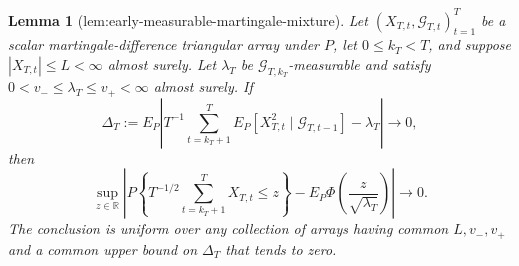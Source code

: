 \documentclass{article}
\newtheorem{lemma}{Lemma}
\begin{document}
\begin{lemma}[lem:early-measurable-martingale-mixture]\label{lem:early-measurable-martingale-mixture}
Let \((X_{T,t},\mathcal G_{T,t})_{t=1}^T\) be a scalar martingale-difference triangular array under \(P\), let \(0\le k_T<T\), and suppose \(|X_{T,t}|\le L<\infty\) almost surely. Let \(\lambda_T\) be \(\mathcal G_{T,k_T}\)-measurable and satisfy \(0<v_-\le\lambda_T\le v_+<\infty\) almost surely. If
\[
 \Delta_T:=E_P\left|T^{-1}\sum_{t=k_T+1}^T
 E_P[X_{T,t}^2\mid\mathcal G_{T,t-1}]-\lambda_T\right|\longrightarrow0,
\]
then
\[
 \sup_{z\in\mathbb R}\left|P\left\{T^{-1/2}\sum_{t=k_T+1}^T X_{T,t}\le z\right\}
 -E_P\Phi\left(\frac{z}{\sqrt{\lambda_T}}\right)\right|\longrightarrow0.
\]
The conclusion is uniform over any collection of arrays having common \(L,v_-,v_+\) and a common upper bound on \(\Delta_T\) that tends to zero.
\end{lemma}
\end{document}
